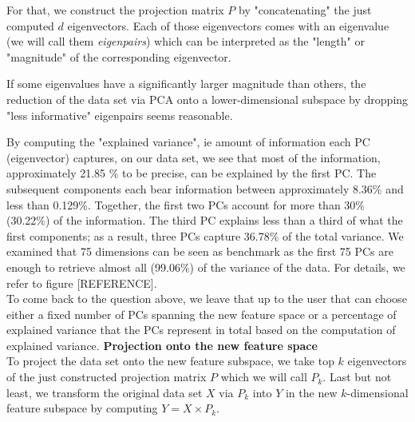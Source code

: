 \documentclass[journal, a4paper]{IEEEtran}
\begin{document}

For that, we construct the projection matrix \( P \) by "concatenating" the just computed \( d \) eigenvectors. Each of those eigenvectors comes with an eigenvalue (we will call them \textit{eigenpairs}) which can be interpreted as the "length" or "magnitude" of the corresponding eigenvector. 

If some eigenvalues have a significantly larger magnitude than others, the reduction of the data set via PCA onto a lower-dimensional subspace by dropping "less informative" eigenpairs seems reasonable.

By computing the "explained variance", ie amount of information each PC (eigenvector) captures, on our data set, we see that most of the information, approximately 21.85 \% to be precise, can be explained by the first PC. The subsequent components each bear information between approximately 8.36\% and less than 0.129\%. Together, the first two PCs account for more than 30\% (30.22\%) of the information. The third PC explains less than a third of what the first components; as a result, three PCs capture 36.78\% of the total variance. We examined that 75 dimensions can be seen as benchmark as the first 75 PCs are enough to retrieve almost all (99.06\%) of the variance of the data. For details, we refer to figure [REFERENCE]. \\


To come back to the question above, we leave that up to the user that can choose either a fixed number of PCs spanning the new feature space or a percentage of explained variance that the PCs represent in total based on the computation of explained variance.
\newline
%
\textbf{Projection onto the new feature space}\\
To project the data set onto the new feature subspace, we take top \( k \) eigenvectors of the just constructed projection matrix \( P \) which we will call \( P_{k} \).
Last but not least, we transform the original data set \( X \) via \( P_{k} \) into \( Y \) in the new \(k\)-dimensional feature subspace by computing \( Y = X \times P_{k} \).
\end{document}

